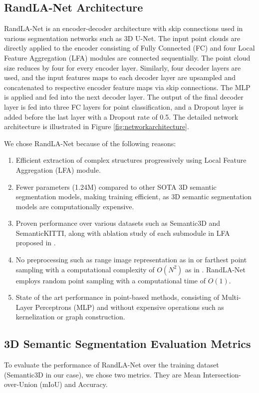 \subsection{RandLA-Net Architecture}
RandLA-Net is an encoder-decoder architecture with skip connections used in various segmentation networks such as 3D U-Net\cite{wang2018two_3DUnet}.
The input point clouds are directly applied to the encoder consisting of Fully Connected (FC) and four Local Feature Aggregation (LFA) modules are connected sequentially.
The point cloud size reduces by four for every encoder layer. 
Similarly, four decoder layers are used, and the input features maps to each decoder layer are upsampled and concatenated to respective encoder feature maps via skip connections.
The MLP is applied and fed into the next decoder layer.
The output of the final decoder layer is fed into three FC layers for point classification, and a Dropout layer is added before the last layer with a Dropout rate of 0.5.
The detailed network architecture is illustrated in Figure \ref{fig:networkarchitecture}.

We chose RandLA-Net because of the following reasons:
\begin{enumerate}
    \item Efficient extraction of complex structures progressively using Local Feature Aggregation (LFA) module.
    \item Fewer parameters (1.24M) compared to other SOTA 3D semantic segmentation models, making training efficient, as 3D semantic segmentation models are computationally expensive.
    \item Proven performance over various datasets such as Semantic3D and SemanticKITTI, along with ablation study of each submodule in LFA proposed in \cite{Hu_2020_CVPR_Randla}.
    \item No preprocessing such as range image representation as in \cite{Milioto2019} or farthest point sampling with a computational complexity of $O(N^2)$ as in \cite{Qi_2017_CVPR_pointnet}. RandLA-Net employs random point sampling with a computational time of $O(1)$.
    \item State of the art performance in point-based methods, consisting of Multi-Layer Perceptrons (MLP) and without expensive operations such as kernelization or graph construction.
\end{enumerate}

\subsection{3D Semantic Segmentation Evaluation Metrics}
To evaluate the performance of RandLA-Net over the training dataset (Semantic3D in our case), we chose two metrics.
They are Mean Intersection-over-Union (mIoU) and Accuracy.

